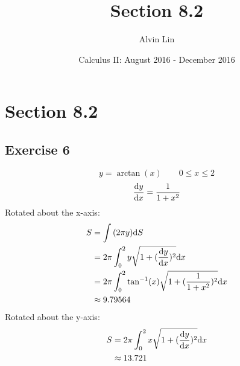 \documentclass{math}
\title{Section 8.2}
\author{Alvin Lin}
\date{Calculus II: August 2016 - December 2016}
\begin{document}
\maketitle

\section*{Section 8.2}

\subsection*{Exercise 6}
\[ y = \arctan(x) \quad \quad 0 \leq x \leq 2 \]
\[ \frac{\mathrm{d}{y}}{\mathrm{d}{x}} = \frac{1}{1+x^{2}} \]
Rotated about the x-axis:
\begin{align*}
  S &= \int{(2\pi y)\mathrm{d}{S}} \\
  &= 2\pi\int_{0}^{2}{y\sqrt{1+(\frac{\mathrm{d}{y}}{\mathrm{d}{x}})^{2}}\mathrm{d}{x}} \\
  &= 2\pi\int_{0}^{2}{\tan^{-1}(x)\sqrt{1+(\frac{1}{1+x^{2}})^{2}}\mathrm{d}{x}} \\
  & \approx 9.79564
\end{align*}
Rotated about the y-axis:
\begin{align*}
  S &= 2\pi\int_{0}^{2}{x\sqrt{1+(\frac{\mathrm{d}{y}}{\mathrm{d}{x}})^{2}}\mathrm{d}{x}} \\
  & \approx 13.721
\end{align*}
\end{document}
